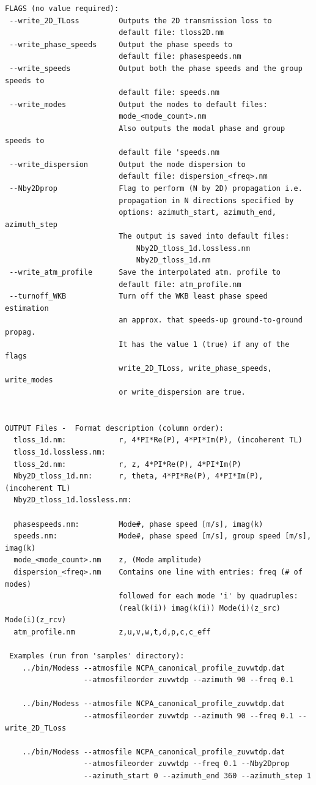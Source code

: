 \begin{verbatim}
FLAGS (no value required):
 --write_2D_TLoss         Outputs the 2D transmission loss to
                          default file: tloss2D.nm
 --write_phase_speeds     Output the phase speeds to
                          default file: phasespeeds.nm
 --write_speeds           Output both the phase speeds and the group speeds to
                          default file: speeds.nm
 --write_modes            Output the modes to default files:
                          mode_<mode_count>.nm
                          Also outputs the modal phase and group speeds to
                          default file 'speeds.nm
 --write_dispersion       Output the mode dispersion to
                          default file: dispersion_<freq>.nm
 --Nby2Dprop              Flag to perform (N by 2D) propagation i.e.
                          propagation in N directions specified by
                          options: azimuth_start, azimuth_end, azimuth_step 
                          The output is saved into default files: 
                              Nby2D_tloss_1d.lossless.nm
                              Nby2D_tloss_1d.nm
 --write_atm_profile      Save the interpolated atm. profile to
                          default file: atm_profile.nm
 --turnoff_WKB            Turn off the WKB least phase speed estimation
                          an approx. that speeds-up ground-to-ground propag.
                          It has the value 1 (true) if any of the flags
                          write_2D_TLoss, write_phase_speeds, write_modes
                          or write_dispersion are true.


OUTPUT Files -  Format description (column order):
  tloss_1d.nm:            r, 4*PI*Re(P), 4*PI*Im(P), (incoherent TL)
  tloss_1d.lossless.nm:
  tloss_2d.nm:            r, z, 4*PI*Re(P), 4*PI*Im(P)
  Nby2D_tloss_1d.nm:      r, theta, 4*PI*Re(P), 4*PI*Im(P), (incoherent TL)
  Nby2D_tloss_1d.lossless.nm:

  phasespeeds.nm:         Mode#, phase speed [m/s], imag(k)
  speeds.nm:              Mode#, phase speed [m/s], group speed [m/s], imag(k)
  mode_<mode_count>.nm    z, (Mode amplitude)
  dispersion_<freq>.nm    Contains one line with entries: freq (# of modes)
                          followed for each mode 'i' by quadruples: 
                          (real(k(i)) imag(k(i)) Mode(i)(z_src) Mode(i)(z_rcv)
  atm_profile.nm          z,u,v,w,t,d,p,c,c_eff

 Examples (run from 'samples' directory): 
    ../bin/Modess --atmosfile NCPA_canonical_profile_zuvwtdp.dat 
                  --atmosfileorder zuvwtdp --azimuth 90 --freq 0.1

    ../bin/Modess --atmosfile NCPA_canonical_profile_zuvwtdp.dat 
                  --atmosfileorder zuvwtdp --azimuth 90 --freq 0.1 --write_2D_TLoss

    ../bin/Modess --atmosfile NCPA_canonical_profile_zuvwtdp.dat 
                  --atmosfileorder zuvwtdp --freq 0.1 --Nby2Dprop 
                  --azimuth_start 0 --azimuth_end 360 --azimuth_step 1
\end{verbatim}

